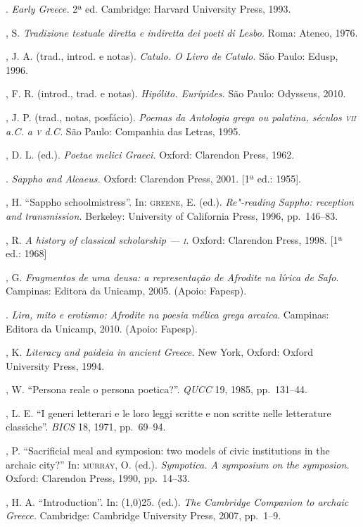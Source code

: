 \begin{bibliohedra}
\titidem. \textit{Early Greece.} 2ª ed.
Cambridge: Harvard University Press, 1993.

, S. \textit{Tradizione testuale diretta e indiretta dei poeti
di Lesbo.} Roma: Ateneo, 1976. 

, J. A. (trad., introd. e notas). \textit{Catulo. O Livro de
Catulo.} São Paulo: Edusp, 1996.

, F. R. (introd., trad. e notas). \textit{Hipólito. Eurípides.}
São Paulo: Odysseus, 2010.

, J. P. (trad., notas, posfácio). \textit{Poemas da Antologia grega
ou palatina, séculos \textsc{vii} a.C. a \textsc{v} d.C.} São Paulo: Companhia das Letras, 1995.

, D. L. (ed.). \textit{Poetae melici Graeci.} Oxford: Clarendon
Press, 1962.

\titidem. \textit{Sappho and Alcaeus.} Oxford: Clarendon
Press, 2001. [1ª ed.: 1955].

, H. “Sappho schoolmistress”. In: \textsc{greene}, E. (ed.).
\textit{Re"-reading Sappho: reception and transmission.} Berkeley: University of
California Press, 1996, pp.~146--83.

, R. \textit{A history of classical scholarship --- \textsc{i}.} Oxford:
Clarendon Press, 1998. [1ª ed.: 1968]

, G. \textit{Fragmentos de uma deusa: a representação de Afrodite
na lírica de Safo}. Campinas: Editora da Unicamp, 2005. (Apoio: Fapesp).

\titidem. \textit{Lira, mito e erotismo: Afrodite na poesia mélica grega
arcaica}. Campinas: Editora da Unicamp, 2010. (Apoio: Fapesp).

, K. \textit{Literacy and paideia in ancient Greece.} New York,
Oxford: Oxford University Press, 1994.

, W. “Persona reale o persona poetica?”. \textit{QUCC} 19, 1985,
pp.~131--44.

, L. E. “I generi letterari e le loro leggi scritte e non scritte
nelle letterature classiche”. \textit{BICS} 18, 1971, pp.~69--94.

, P. “Sacrificial meal and symposion: two models of
civic institutions in the archaic city?” In: \textsc{murray}, O. (ed.).
\textit{Sympotica. A symposium on the symposion.} Oxford: Clarendon Press,
1990, pp.~14--33.

, H. A. “Introduction”. In: \line(1,0){25}.
(ed.). \textit{The Cambridge Companion to archaic Greece.} Cambridge: Cambridge
University Press, 2007, pp.~1--9.


\end{bibliohedra}

